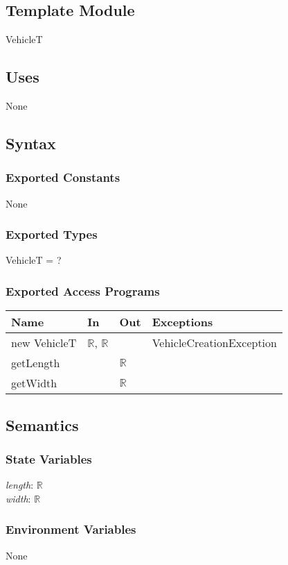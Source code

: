 \documentclass[12pt, titlepage]{article}
\begin{document}
\subsection{Template Module}
VehicleT

\subsection{Uses}
None

\subsection{Syntax}

\subsubsection{Exported Constants}
None

\subsubsection{Exported Types}
VehicleT = ?

\subsubsection{Exported Access Programs}

\begin{tabular}{p{4cm} p{3cm} p{2cm} p{5cm}}
\hline
\textbf{Name} & \textbf{In} & \textbf{Out} & \textbf{Exceptions} \\
\hline
new VehicleT & $\mathbb{R}$, $\mathbb{R}$ & ~ & VehicleCreationException \\
getLength & ~ & $\mathbb{R}$ & ~ \\
getWidth & ~ & $\mathbb{R}$ & ~ \\
\hline
\end{tabular}

\subsection{Semantics}

\subsubsection{State Variables}
\textit{length}: $\mathbb{R}$ \\
\textit{width}: $\mathbb{R}$

\subsubsection{Environment Variables}
None
\end{document}
